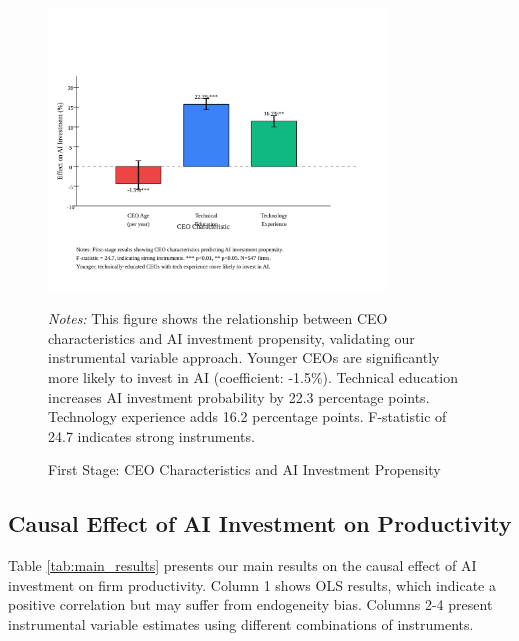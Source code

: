 \documentclass[12pt]{article}
\begin{document}
\begin{figure}[H]
\centering
\includegraphics[width=0.8\textwidth]{figures/figure6_first_stage.svg}
\caption{First Stage: CEO Characteristics and AI Investment Propensity}
\label{fig:first_stage}
\begin{minipage}{\textwidth}
\footnotesize
\textit{Notes:} This figure shows the relationship between CEO characteristics and AI investment propensity, validating our instrumental variable approach. Younger CEOs are significantly more likely to invest in AI (coefficient: -1.5\%). Technical education increases AI investment probability by 22.3 percentage points. Technology experience adds 16.2 percentage points. F-statistic of 24.7 indicates strong instruments.
\end{minipage}
\end{figure}

\subsection{Causal Effect of AI Investment on Productivity}

Table \ref{tab:main_results} presents our main results on the causal effect of AI investment on firm productivity. Column 1 shows OLS results, which indicate a positive correlation but may suffer from endogeneity bias. Columns 2-4 present instrumental variable estimates using different combinations of instruments.
\end{document}
